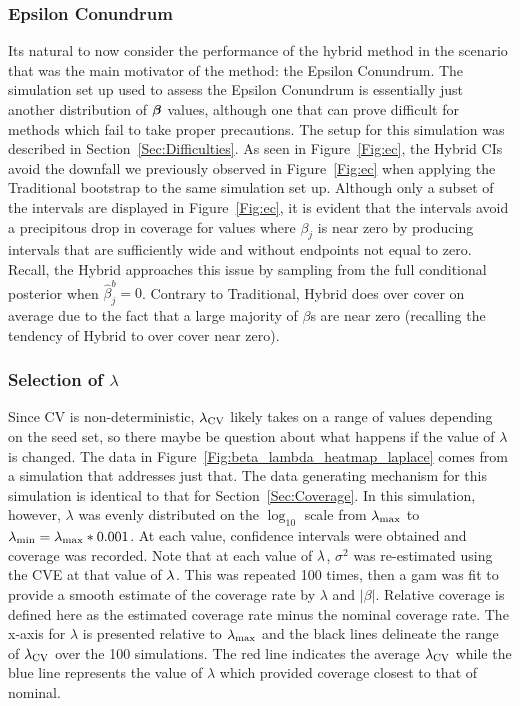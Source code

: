 \subsubsection{Epsilon Conundrum}\label{Sec:Epsilon}


Its natural to now consider the performance of the hybrid method in the scenario that was the main motivator of the method: the Epsilon Conundrum. The simulation set up used to assess the Epsilon Conundrum is essentially just another distribution of $\boldsymbol{\beta}$ values, although one that can prove difficult for methods which fail to take proper precautions. The setup for this simulation was described in Section~\ref{Sec:Difficulties}. As seen in Figure~\ref{Fig:ec}, the Hybrid CIs avoid the downfall we previously observed in Figure~\ref{Fig:ec} when applying the Traditional bootstrap to the same simulation set up. Although only a subset of the intervals are displayed in Figure~\ref{Fig:ec}, it is evident that the intervals avoid a precipitous drop in coverage for values where $\beta_j$ is near zero by producing intervals that are sufficiently wide and without endpoints not equal to zero. Recall, the Hybrid approaches this issue by sampling from the full conditional posterior when $\hat{\beta}_j^b = 0$. Contrary to Traditional, Hybrid does over cover on average due to the fact that a large majority of $\beta$s are near zero (recalling the tendency of Hybrid to over cover near zero).

\subsubsection{Selection of \texorpdfstring{$\lambda$}{lambda}} \label{Sec:lambda}

Since CV is non-deterministic, $\lambda_{\textrm{CV}}$ likely takes on a range of values depending on the seed set, so there maybe be question about what happens if the value of $\lambda$ is changed. The data in Figure~\ref{Fig:beta_lambda_heatmap_laplace} comes from a simulation that addresses just that. The data generating mechanism for this simulation is identical to that for Section~\ref{Sec:Coverage}. In this simulation, however, $\lambda$ was evenly distributed on the $\log_{10}$ scale from $\lambda_{\max}$ to $\lambda_{\min} = \lambda_{\max} * 0.001$. At each value, confidence intervals were obtained and coverage was recorded. Note that at each value of $\lambda$, $\sigma^2$ was re-estimated using the CVE at that value of $\lambda$. This was repeated 100 times, then a gam was fit to provide a smooth estimate of the coverage rate by $\lambda$ and $|\beta|$. Relative coverage is defined here as the estimated coverage rate minus the nominal coverage rate. The x-axis for $\lambda$ is presented relative to $\lambda_{\max}$ and the black lines delineate the range of $\lambda_{\textrm{CV}}$ over the 100 simulations. The red line indicates the average $\lambda_{\textrm{CV}}$ while the blue line represents the value of $\lambda$ which provided coverage closest to that of nominal.


